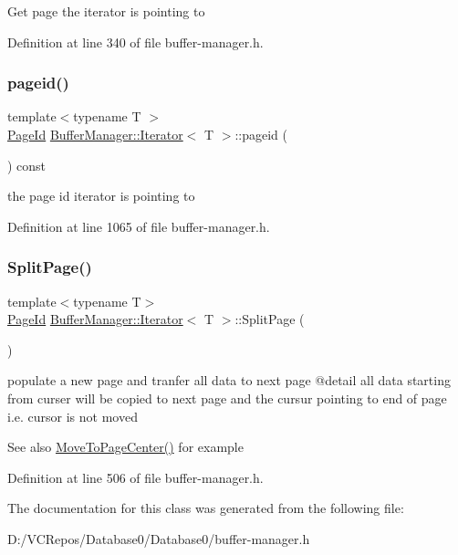 Get page the iterator is pointing to 

Definition at line 340 of file buffer-\/manager.\+h.

\mbox{\label{class_buffer_manager_1_1_iterator_a7a57002c7f8daa714cf9e19e34874fca}} 
\subsubsection{\texorpdfstring{pageid()}{pageid()}}
{\footnotesize\ttfamily template$<$typename T $>$ \\
\mbox{\hyperlink{struct_generic_i_o_id}{Page\+Id}} \mbox{\hyperlink{class_buffer_manager_1_1_iterator}{Buffer\+Manager\+::\+Iterator}}$<$ T $>$\+::pageid (\begin{DoxyParamCaption}{ }\end{DoxyParamCaption}) const\hspace{0.3cm}{\ttfamily [inline]}}

the page id iterator is pointing to 

Definition at line 1065 of file buffer-\/manager.\+h.

\mbox{\label{class_buffer_manager_1_1_iterator_a18f31d37240c5a587a85042374c5272d}} 
\subsubsection{\texorpdfstring{SplitPage()}{SplitPage()}}
{\footnotesize\ttfamily template$<$typename T$>$ \\
\mbox{\hyperlink{struct_generic_i_o_id}{Page\+Id}} \mbox{\hyperlink{class_buffer_manager_1_1_iterator}{Buffer\+Manager\+::\+Iterator}}$<$ T $>$\+::Split\+Page (\begin{DoxyParamCaption}{ }\end{DoxyParamCaption})\hspace{0.3cm}{\ttfamily [inline]}}

populate a new page and tranfer all data to next page @detail all data starting from curser will be copied to next page and the cursur pointing to end of page i.\+e. cursor is not moved \begin{DoxySeeAlso}{See also}
\mbox{\hyperlink{class_buffer_manager_1_1_iterator_a20b703d6135c5e3026eab944a32ca186}{Move\+To\+Page\+Center()}} for example 
\end{DoxySeeAlso}


Definition at line 506 of file buffer-\/manager.\+h.



The documentation for this class was generated from the following file\+:\begin{DoxyCompactItemize}
\item 
D\+:/\+V\+C\+Repos/\+Database0/\+Database0/buffer-\/manager.\+h\end{DoxyCompactItemize}
